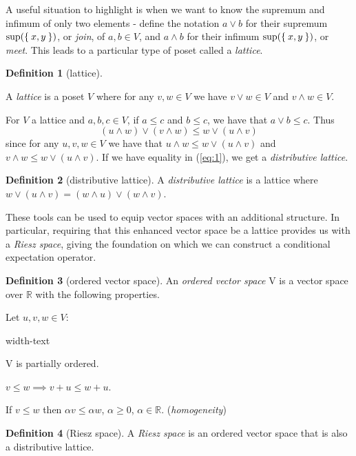 \documentclass[letterpaper,10pt,oneside,onecolumn,reqno]{amsart}
\newcommand{\R}{\mathbb R}
\theoremstyle{definition}
\newtheorem{defn}{Definition}
\newcommand{\meet}{\wedge}
\newcommand{\join}{\vee}
\begin{document}
A useful situation to highlight is when we want to know the supremum
and infimum of only two elements - define the notation $a \join b$ for
their supremum $\sup(\Set{x,y})$, or \emph{join}, of $a,b \in V$, and
$a \meet b$ for their infimum $\sup(\Set{x,y})$, or \emph{meet}. This
leads to a particular type of poset called a \emph{lattice}.


\begin{framed}
  \begin{defn}[lattice]\label{def:3}

    A \emph{lattice} is a poset $V$ where for any $v,w
    \in V$ we have $v \join w \in V$ and $v \meet w \in V$.

  \end{defn}
\end{framed}

For $V$ a lattice and $a,b,c \in V$, if $a \leq c $ and $b \leq c $,
we have that $a \join b \leq c $. Thus
\begin{equation}
  \label{eq:1}
  (u \meet w) \join (v \meet w) \leq w \join (u \meet v)
\end{equation}
since for any $u,v,w \in V$ we have that $u \meet w \leq w \join (u
\meet v)$ and $v \meet w \leq w \join (u \meet v)$. If we have
equality in (\ref{eq:1}), we get a \emph{distributive lattice}.


\begin{framed}
  \begin{defn}[distributive lattice]\label{def:4} %
    A \emph{distributive lattice} is a
    lattice where $w \join (u \meet v) = (w \meet u) \join (w \meet
    v)$.
  \end{defn}
\end{framed}

These tools can be used to equip vector spaces with an additional
structure. In particular, requiring that this enhanced vector space be
a lattice provides us with a \emph{Riesz space}, giving the
foundation on which we can construct a conditional expectation
operator.

\begin{framed}
  \begin{defn}[ordered vector space]\label{def:5}
    An \emph{ordered vector space} V is a
    vector space over $\R$ with the following properties.

    Let $u,v,w \in V$:
    \begin{deflist}{width-text}
    \item V is partially ordered.
    \item $v \leq w \implies v + u \leq w + u$.
    \item If $v \leq w$ then $\alpha v \leq \alpha w$, $\alpha \geq
      0$, $\alpha \in \R$. (\emph{homogeneity})
    \end{deflist}
  \end{defn}

\begin{defn}[Riesz space]\label{def:6}
  A \emph{Riesz space} is an ordered vector space
  that is also a distributive lattice.
\end{defn}
\end{framed}
\end{document}
